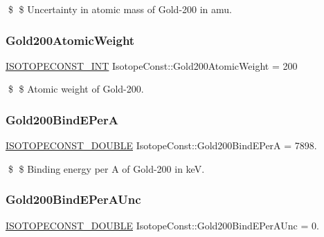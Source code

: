 \$ \$ Uncertainty in atomic mass of Gold-\/200 in amu. \mbox{\label{group___isotope_const-_gold-_au200_ga28819ddcf685d851774f1aa3e8e4b64c}} 
\subsubsection{\texorpdfstring{Gold200\+Atomic\+Weight}{Gold200AtomicWeight}}
{\footnotesize\ttfamily \mbox{\hyperlink{group___isotope_const-_macros_ga5f18360b3e99483a35c32d789e62621c}{I\+S\+O\+T\+O\+P\+E\+C\+O\+N\+S\+T\+\_\+\+I\+NT}} Isotope\+Const\+::\+Gold200\+Atomic\+Weight = 200}

\$ \$ Atomic weight of Gold-\/200. \mbox{\label{group___isotope_const-_gold-_au200_ga0db644415e9a8e62e678acb56206d6d7}} 
\subsubsection{\texorpdfstring{Gold200\+Bind\+E\+PerA}{Gold200BindEPerA}}
{\footnotesize\ttfamily \mbox{\hyperlink{group___isotope_const-_macros_ga8f45a7272ce02c0b4c65c44636ed719a}{I\+S\+O\+T\+O\+P\+E\+C\+O\+N\+S\+T\+\_\+\+D\+O\+U\+B\+LE}} Isotope\+Const\+::\+Gold200\+Bind\+E\+PerA = 7898.}

\$ \$ Binding energy per A of Gold-\/200 in keV. \mbox{\label{group___isotope_const-_gold-_au200_ga5f09091a478cc40e5ea5c75c29f03906}} 
\subsubsection{\texorpdfstring{Gold200\+Bind\+E\+Per\+A\+Unc}{Gold200BindEPerAUnc}}
{\footnotesize\ttfamily \mbox{\hyperlink{group___isotope_const-_macros_ga8f45a7272ce02c0b4c65c44636ed719a}{I\+S\+O\+T\+O\+P\+E\+C\+O\+N\+S\+T\+\_\+\+D\+O\+U\+B\+LE}} Isotope\+Const\+::\+Gold200\+Bind\+E\+Per\+A\+Unc = 0.}

